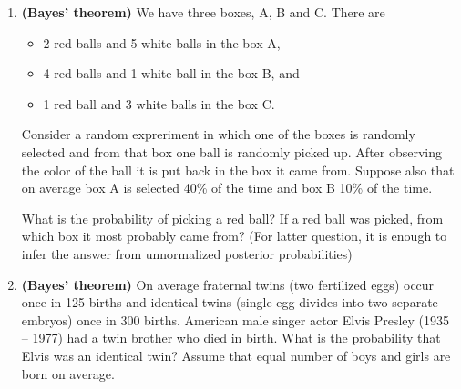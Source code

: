 \documentclass[11pt,a4paper,english]{article}
\begin{document}
\begin{enumerate}
\item {\bf (Bayes' theorem)} We have three boxes, A, B and C. There are
  \begin{itemize}
    \item 2 red balls and 5 white balls in the box A,
    \item 4 red balls and 1 white ball in the box B, and
    \item 1 red ball and 3 white balls in the box C.
  \end{itemize}
Consider a random expreriment in which one of the boxes is randomly
selected and from that box one ball is randomly picked up. After
observing the color of the ball it is put back in the box it came
from. Suppose also that on average box A is selected 40\% of the time
and box B 10\% of the time.

What is the probability of picking a red ball? If a red ball was
picked, from which box it most probably came from? (For latter question, it is enough to infer the answer from unnormalized posterior probabilities)



\item {\bf (Bayes' theorem)} On average fraternal twins (two fertilized eggs) occur once in 125
births and identical twins (single egg divides into two separate
embryos) once in 300 births.
American male singer actor Elvis Presley (1935 -- 1977) had a twin brother who died in birth.
What is the probability that Elvis was an identical twin?
Assume that equal number of boys and girls are born on average.
\end{enumerate}
\end{document}
